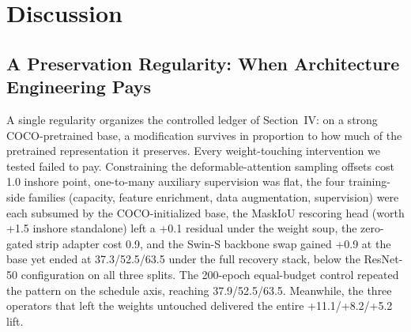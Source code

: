 
\section{Discussion}
\label{sec:discussion}

\subsection{A Preservation Regularity: When Architecture Engineering Pays}
\label{sec:disc-preservation}

A single regularity organizes the controlled ledger of Section~IV: on a strong COCO-pretrained base, a modification survives in proportion to how much of the pretrained representation it preserves. Every weight-touching intervention we tested failed to pay. Constraining the deformable-attention sampling offsets cost 1.0 inshore point, one-to-many auxiliary supervision was flat, the four training-side families (capacity, feature enrichment, data augmentation, supervision) were each subsumed by the COCO-initialized base, the MaskIoU rescoring head (worth +1.5 inshore standalone) left a +0.1 residual under the weight soup, the zero-gated strip adapter cost 0.9, and the Swin-S backbone swap gained +0.9 at the base yet ended at 37.3/52.5/63.5 under the full recovery stack, below the ResNet-50 configuration on all three splits. The 200-epoch equal-budget control repeated the pattern on the schedule axis, reaching 37.9/52.5/63.5. Meanwhile, the three operators that left the weights untouched delivered the entire +11.1/+8.2/+5.2 lift.

